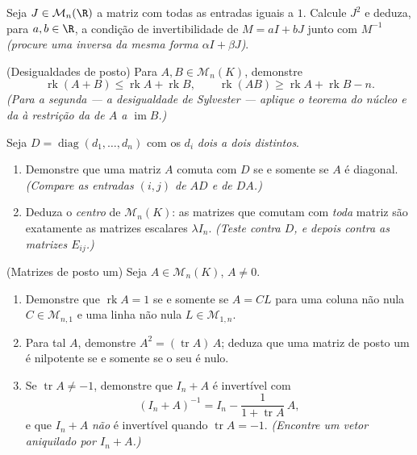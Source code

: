\begin{exercise}[$\star\star\star$]\label{exo:b1:matrices:9}
Seja $J \in \mathcal{M}_n(\R)$ a matriz com todas as entradas iguais a $1$. Calcule
$J^2$ e deduza, para $a, b \in \R$, a condição de invertibilidade de $M
= aI + bJ$
junto com $M^{-1}$ \emph{(procure uma inversa da mesma forma
$\alpha I + \beta J$)}.
\end{exercise}

\begin{exercise}[$\star\star\star$]\label{exo:b1:matrices:10}
(Desigualdades de posto) Para $A, B \in \mathcal{M}_n(K)$, demonstre
\[
\operatorname{rk}(A + B) \leq \operatorname{rk} A +
\operatorname{rk} B,
\qquad
\operatorname{rk}(AB) \geq \operatorname{rk} A + \operatorname{rk}
B - n .
\]
\emph{(Para a segunda --- a desigualdade de Sylvester --- aplique o
teorema do núcleo e da  à restrição da  de $A$ a
$\operatorname{im} B$.)}
\end{exercise}

\begin{exercise}[$\star\star$]\label{exo:b1:matrices:11}
Seja $D = \operatorname{diag}(d_1, \dots, d_n)$ com os $d_i$ \emph{dois a dois distintos}.
\begin{enumerate}
  \item Demonstre que uma matriz $A$ comuta com $D$ se e somente se
        $A$ é diagonal. \emph{(Compare as entradas $(i,j)$ de $AD$
        e de $DA$.)}
  \item Deduza o \emph{centro} de $\mathcal{M}_n(K)$: as matrizes que comutam
        com \emph{toda} matriz são exatamente as matrizes escalares
        $\lambda I_n$. \emph{(Teste contra $D$, e depois contra as matrizes
        $E_{ij}$.)}
\end{enumerate}
\end{exercise}

\begin{exercise}[$\star\star\star$]\label{exo:b1:matrices:12}
(Matrizes de posto um) Seja $A \in \mathcal{M}_n(K)$, $A \neq 0$.
\begin{enumerate}
  \item Demonstre que $\operatorname{rk} A = 1$ se e somente se $A =
        CL$ para uma coluna
        não nula $C \in \mathcal{M}_{n,1}$ e uma linha não nula $L \in \mathcal{M}_{1,n}$.
  \item Para tal $A$, demonstre $A^2 = (\operatorname{tr} A)\,A$; deduza que uma matriz de
        posto um é nilpotente se e somente se o seu  é nulo.
  \item Se $\operatorname{tr} A \neq -1$, demonstre que $I_n + A$ é invertível com
        \[
        (I_n + A)^{-1} = I_n - \frac{1}{1 + \operatorname{tr}
        A}\,A ,
        \]
        e que $I_n + A$ \emph{não} é invertível quando $\operatorname{tr} A = -1$.
        \emph{(Encontre um vetor aniquilado por $I_n + A$.)}
\end{enumerate}
\end{exercise}

